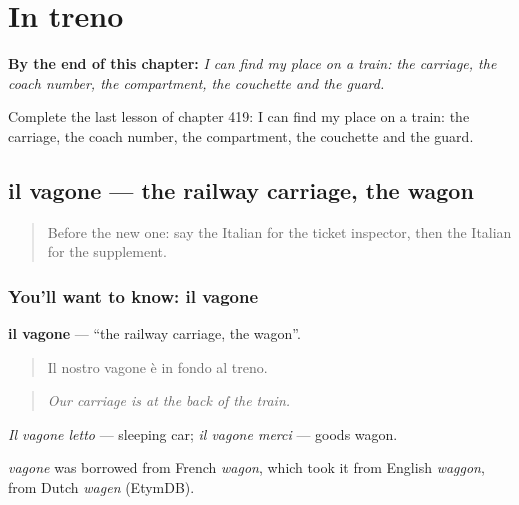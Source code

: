 
\chapter{In treno}
\label{ch:it-in-treno}

\begin{chapteropening}
\textbf{By the end of this chapter:} \emph{I can find my place on a train: the carriage, the coach number, the compartment, the couchette and the guard.}

Complete the last lesson of chapter 419: I can find my place on a train: the carriage, the coach number, the compartment, the couchette and the guard.
\end{chapteropening}

\section[il vagone]{il vagone — the railway carriage, the wagon}

\label{lesson:IT-C419-vagone}



\begin{quote}
Before the new one: say the Italian for the ticket inspector, then the Italian for the supplement.
\end{quote}

\subsection*{You'll want to know: il vagone}
\textbf{il vagone} — \textquotedblleft{}the railway carriage, the wagon\textquotedblright{}.

\begin{quote}
Il nostro vagone è in fondo al treno.
\end{quote}

\begin{quote}
\emph{Our carriage is at the back of the train.}
\end{quote}

\emph{Il vagone letto} — sleeping car; \emph{il vagone merci} — goods wagon.

\begin{cousinweb}
\emph{vagone} was borrowed from French \emph{wagon}, which took it from English \emph{waggon}, from Dutch \emph{wagen} (EtymDB).
\end{cousinweb}

